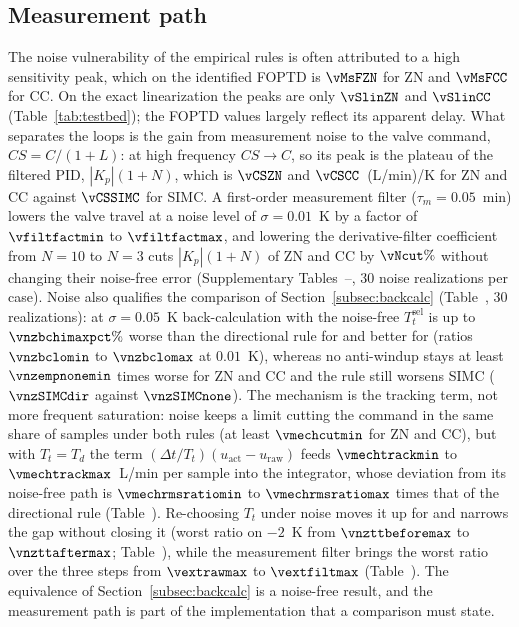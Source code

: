 \subsection{Measurement path}
\label{subsec:measurement_path}
The noise vulnerability of the empirical rules is often attributed to a high sensitivity peak, which on the identified FOPTD is $\vMsFZN$ for ZN and $\vMsFCC$ for CC. On the exact linearization the peaks are only $\vSlinZN$ and $\vSlinCC$ (Table~\ref{tab:testbed}); the FOPTD values largely reflect its apparent delay. What separates the loops is the gain from measurement noise to the valve command, $CS = C/(1+L)$: at high frequency $CS \to C$, so its peak is the plateau of the filtered PID, $|K_p|(1+N)$, which is $\vCSZN$ and $\vCSCC$~(L/min)/K for ZN and CC against $\vCSSIMC$ for SIMC. A first-order measurement filter ($\tau_m = 0.05$~min) lowers the valve travel at a noise level of $\sigma = 0.01$~K by a factor of $\vfiltfactmin$ to $\vfiltfactmax$, and lowering the derivative-filter coefficient from $N = 10$ to $N = 3$ cuts $|K_p|(1+N)$ of ZN and CC by $\vNcut\%$ without changing their noise-free error (Supplementary Tables~--, $30$ noise realizations per case). Noise also qualifies the comparison of Section~\ref{subsec:backcalc} (Table~, $30$ realizations): at $\sigma = 0.05$~K back-calculation with the noise-free $T_t^{\mathrm{sel}}$ is up to $\vnzbchimaxpct\%$ worse than the directional rule for \vnzbcworse{} and better for \vnzbcbetter{} (ratios $\vnzbclomin$ to $\vnzbclomax$ at $0.01$~K), whereas no anti-windup stays at least $\vnzempnonemin$ times worse for ZN and CC and the rule still worsens SIMC ($\vnzSIMCdir$ against $\vnzSIMCnone$). The mechanism is the tracking term, not more frequent saturation: noise keeps a limit cutting the command in the same share of samples under both rules (at least $\vmechcutmin$ for ZN and CC), but with $T_t = T_d$ the term $(\Delta t/T_t)(u_{\text{act}} - u_{\text{raw}})$ feeds $\vmechtrackmin$ to $\vmechtrackmax$~L/min per sample into the integrator, whose deviation from its noise-free path is $\vmechrmsratiomin$ to $\vmechrmsratiomax$ times that of the directional rule (Table~). Re-choosing $T_t$ under noise moves it up for \vnzttchanged{} and narrows the gap without closing it (worst ratio on $-2$~K from $\vnzttbeforemax$ to $\vnzttaftermax$; Table~), while the measurement filter brings the worst ratio over the three steps from $\vextrawmax$ to $\vextfiltmax$ (Table~). The equivalence of Section~\ref{subsec:backcalc} is a noise-free result, and the measurement path is part of the implementation that a comparison must state.

